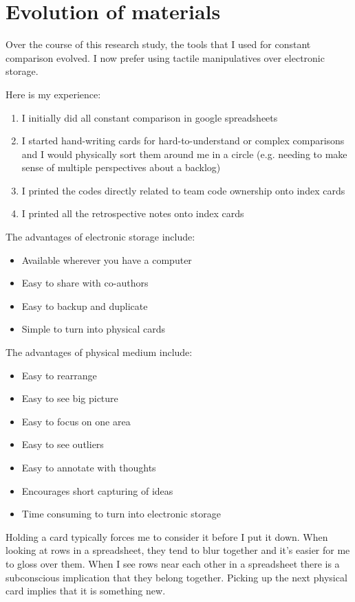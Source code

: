 \section{Evolution of materials}
Over the course of this research study, the tools that I used for constant comparison evolved. I now prefer using tactile manipulatives over electronic storage. 

Here is my experience:
\begin{enumerate}
  \item I initially did all constant comparison in google spreadsheets
  \item I started hand-writing cards for hard-to-understand or complex comparisons and I would physically sort them around me in a circle (e.g. needing to make sense of multiple perspectives about a backlog)
  \item I printed the codes directly related to team code ownership onto index cards
  \item I printed all the retrospective notes onto index cards
\end{enumerate}

The advantages of electronic storage include:
\begin{itemize}
  \item Available wherever you have a computer
  \item Easy to share with co-authors
  \item Easy to backup and duplicate
  \item Simple to turn into physical cards
\end{itemize}

The advantages of physical medium include:
\begin{itemize}
  \item Easy to rearrange
  \item Easy to see big picture 
  \item Easy to focus on one area
  \item Easy to see outliers
  \item Easy to annotate with thoughts
  \item Encourages short capturing of ideas
  \item Time consuming to turn into electronic storage
\end{itemize}

Holding a card typically forces me to consider it before I put it down. When looking at rows in a spreadsheet, they tend to blur together and it's easier for me to gloss over them. When I see rows near each other in a spreadsheet there is a subconscious implication that they belong together. Picking up the next physical card implies that it is something new. 

